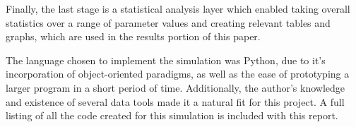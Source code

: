 Finally, the last stage is a statistical analysis layer which enabled taking overall
statistics over a range of parameter values and creating relevant tables and graphs,
which are used in the results portion of this paper.

The language chosen to implement the simulation was Python, due to it's incorporation of 
object-oriented paradigms, as well as the ease of prototyping a larger program in a 
short period of time.
Additionally, the author's knowledge and existence of several data tools made it a natural
fit for this project.
A full listing of all the code created for this simulation is included with this report.
